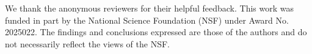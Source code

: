 


\begin{acks}
We thank the anonymous reviewers for their helpful feedback. 
This work was funded in part by the National Science Foundation (NSF) under Award No. 2025022. The findings and conclusions expressed are those of the authors and do not necessarily reflect the views of the NSF.
\end{acks}
